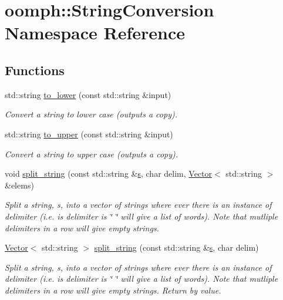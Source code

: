 \hypertarget{namespaceoomph_1_1StringConversion}{}\section{oomph\+:\+:String\+Conversion Namespace Reference}
\label{namespaceoomph_1_1StringConversion}
\subsection*{Functions}
\begin{DoxyCompactItemize}
\item 
std\+::string \hyperlink{namespaceoomph_1_1StringConversion_aab6637703088959640bd73844a597728}{to\+\_\+lower} (const std\+::string \&input)
\begin{DoxyCompactList}\small\item\em Convert a string to lower case (outputs a copy). \end{DoxyCompactList}\item 
std\+::string \hyperlink{namespaceoomph_1_1StringConversion_afdee5876392b9daa3563484f63a9b55f}{to\+\_\+upper} (const std\+::string \&input)
\begin{DoxyCompactList}\small\item\em Convert a string to upper case (outputs a copy). \end{DoxyCompactList}\item 
void \hyperlink{namespaceoomph_1_1StringConversion_a1fe241d2c1aab5ce0a8a6bcdf7c92a4e}{split\+\_\+string} (const std\+::string \&\hyperlink{cfortran_8h_ab7123126e4885ef647dd9c6e3807a21c}{s}, char delim, \hyperlink{classoomph_1_1Vector}{Vector}$<$ std\+::string $>$ \&elems)
\begin{DoxyCompactList}\small\item\em Split a string, s, into a vector of strings where ever there is an instance of delimiter (i.\+e. is delimiter is \char`\"{} \char`\"{} will give a list of words). Note that mutliple delimiters in a row will give empty strings. \end{DoxyCompactList}\item 
\hyperlink{classoomph_1_1Vector}{Vector}$<$ std\+::string $>$ \hyperlink{namespaceoomph_1_1StringConversion_a15f87a508bc9515945d8c8891e7134a9}{split\+\_\+string} (const std\+::string \&\hyperlink{cfortran_8h_ab7123126e4885ef647dd9c6e3807a21c}{s}, char delim)
\begin{DoxyCompactList}\small\item\em Split a string, s, into a vector of strings where ever there is an instance of delimiter (i.\+e. is delimiter is \char`\"{} \char`\"{} will give a list of words). Note that mutliple delimiters in a row will give empty strings. Return by value. \end{DoxyCompactList}\item 

\end{DoxyCompactItemize}

